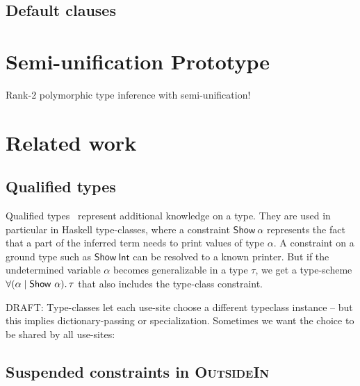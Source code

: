 \documentclass[acmsmall,screen,nonacm]{acmart}
\begin{document}
\subsection{Default clauses}


\section{Semi-unification Prototype}

Rank-2 polymorphic type inference with semi-unification!


\section{Related work}
\label{sec:related-work}

\subsection{Qualified types}


Qualified types~\citep*{TODO} represent additional knowledge on a type. They
are used in particular in Haskell type-classes, where a constraint
$\mathsf{Show}~\alpha$ represents the fact that a part of the inferred term
needs to print values of type $\alpha$. A constraint on a ground type such
as $\mathsf{Show}~\mathsf{Int}$ can be resolved to a known printer. But if
the undetermined variable $\alpha$ becomes generalizable in a type $\tau$,
we get a type-scheme $\forall {(\alpha \mid \mathsf{Show}~\alpha)}.\,{\tau}$ that
also includes the type-class constraint.

DRAFT: Type-classes let each use-site choose a different typeclass instance
-- but this implies dictionary-passing or specialization. Sometimes we want
the choice to be shared by all use-sites:


\subsection{Suspended constraints in \textsc{OutsideIn}}

\end{document}
